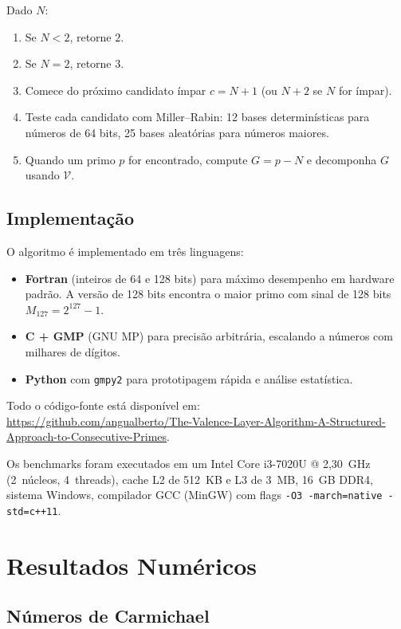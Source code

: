 \documentclass[12pt,a4paper]{article}
\theoremstyle{plain}
\begin{document}
Dado $N$:
\begin{enumerate}
  \item Se $N<2$, retorne $2$.
  \item Se $N=2$, retorne $3$.
  \item Comece do próximo candidato ímpar $c=N+1$ (ou $N+2$ se
    $N$ for ímpar).
  \item Teste cada candidato com Miller--Rabin: 12 bases
    determinísticas para números de 64 bits, 25 bases aleatórias para números maiores.
  \item Quando um primo $p$ for encontrado, compute $G=p-N$ e decomponha
    $G$ usando $\mathcal{V}$.
\end{enumerate}

\subsection{Implementação}
\label{sec:impl}

O algoritmo é implementado em três linguagens:
\begin{itemize}
  \item {\bf Fortran} (inteiros de 64 e 128 bits) para máximo
    desempenho em hardware padrão.  A versão de 128 bits encontra
    o maior primo com sinal de 128 bits $M_{127}=2^{127}-1$.
  \item {\bf C + GMP} (GNU MP) para precisão arbitrária, escalando
    a números com milhares de dígitos.
  \item {\bf Python} com {\tt gmpy2} para prototipagem rápida e
    análise estatística.
\end{itemize}

Todo o código-fonte está disponível em:\\
\url{https://github.com/angualberto/The-Valence-Layer-Algorithm-A-Structured-Approach-to-Consecutive-Primes}.

Os benchmarks foram executados em um Intel Core i3-7020U @ 2,30~GHz
(2~núcleos, 4~threads), cache L2 de 512~KB e L3 de 3~MB, 16~GB
DDR4, sistema Windows, compilador GCC (MinGW) com flags
\texttt{-O3 -march=native -std=c++11}.

\section{Resultados Numéricos}
\label{sec:num}

\subsection{Números de Carmichael}
\end{document}

